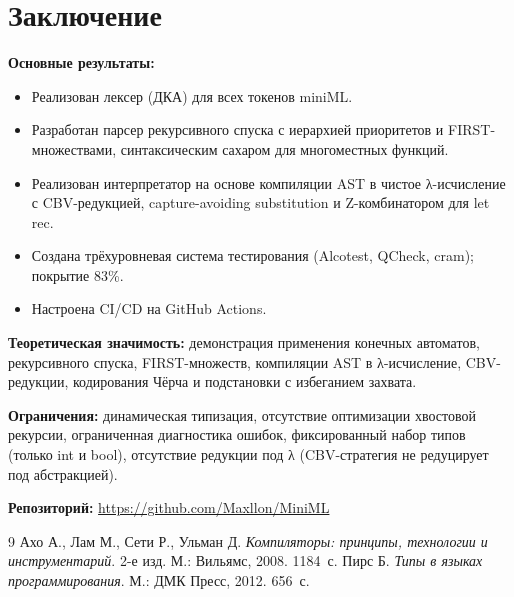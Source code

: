 \documentclass[a4paper]{article}
\begin{document}
\section{Заключение}

\textbf{Основные результаты:}
\begin{itemize}
    \item Реализован лексер (ДКА) для всех токенов miniML.
    \item Разработан парсер рекурсивного спуска с иерархией приоритетов и FIRST-множествами, синтаксическим сахаром для многоместных функций.
    \item Реализован интерпретатор на основе компиляции AST в чистое λ-исчисление с CBV-редукцией, capture-avoiding substitution и Z-комбинатором для let rec.
    \item Создана трёхуровневая система тестирования (Alcotest, QCheck, cram); покрытие 83\%.
    \item Настроена CI/CD на GitHub Actions.
\end{itemize}

\textbf{Теоретическая значимость:} демонстрация применения конечных автоматов, рекурсивного спуска, FIRST-множеств, компиляции AST в λ-исчисление, CBV-редукции, кодирования Чёрча и подстановки с избеганием захвата.

\textbf{Ограничения:} динамическая типизация, отсутствие оптимизации хвостовой рекурсии, ограниченная диагностика ошибок, фиксированный набор типов (только int и bool), отсутствие редукции под λ (CBV-стратегия не редуцирует под абстракцией).

\textbf{Репозиторий:} \url{https://github.com/Maxllon/MiniML}

\begin{thebibliography}{9}
     Ахо А., Лам М., Сети Р., Ульман Д. {\itshape Компиляторы: принципы, технологии и инструментарий}. 2-е изд. М.: Вильямс, 2008. 1184~с.
     Пирс Б. {\itshape Типы в языках программирования}. М.: ДМК Пресс, 2012. 656~с.
\end{thebibliography}
\end{document}
